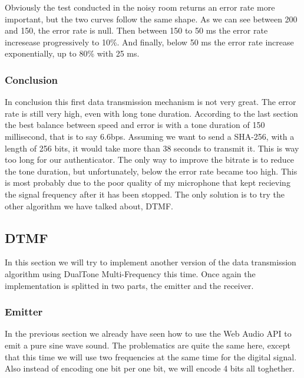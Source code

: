 \documentclass[twocolumn,14pt]{extarticle}
\begin{document}
Obviously the test conducted in the noisy room returns an error rate more important, but the two curves follow the same shape. As we can see between 200 and 150, the error rate is null. Then between 150 to 50 ms the error rate incresease progressively to 10\%. And finally, below 50 ms the error rate increase exponentially, up to 80\% with 25 ms.

\subsubsection{Conclusion}
In conclusion this first data transmission mechanism is not very great. The error rate is still very high, even with long tone duration. According to the last section the best balance between speed and error is with a tone duration of 150 millisecond, that is to say 6.6bps. Assuming we want to send a SHA-256, with a length of 256 bits, it would take more than 38 seconds to transmit it. This is way too long for our authenticator. The only way to improve the bitrate is to reduce the tone duration, but unfortunately, below the error rate became too high. This is most probably due to the poor quality of my microphone that kept recieving the signal frequency after it has been stopped. The only solution is to try the other algorithm we have talked about, DTMF.

\subsection{DTMF}
In this section we will try to implement another version of the data transmission algorithm using DualTone Multi-Frequency this time. Once again the implementation is splitted in two parts, the emitter and the receiver.

\subsubsection{Emitter}
In the previous section we already have seen how to use the Web Audio API to emit a pure sine wave sound. The problematics are quite the same here, except that this time we will use two frequencies at the same time for the digital signal. Also instead of encoding one bit per one bit, we will encode 4 bits all toghether. 
\end{document}
